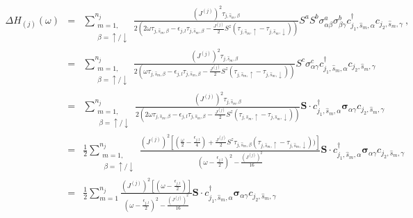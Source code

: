 \documentclass[aps,prl,preprint,groupedaddress]{revtex4-2}
\begin{document}
\begin{eqnarray}
\Delta H_{(j)}(\omega)&=&\sum_{\substack{m=1,\\ \beta=\uparrow/\downarrow}}^{n_{j}}\frac{(J^{(j)})^{2}\tau_{j,\hat{s}_{m},\beta}}{2(2\omega\tau_{j,\hat{s}_{m},\beta} - \epsilon_{j,l}\tau_{j,\hat{s}_{m},\beta}-\frac{J^{(j)}}{2}S^{z}(\tau_{j,\hat{s}_{m},\uparrow}-\tau_{j,\hat{s}_{m},\downarrow}))}S^{a}S^{b}\sigma^{a}_{\alpha\beta}\sigma^{b}_{\beta\gamma} c^{\dagger}_{j_{1},\hat{s}_{m},\alpha}c_{j_{2},\hat{s}_{m},\gamma}~,~~~~~~\nonumber\\
&=&\sum_{\substack{m=1,\\ \beta=\uparrow/\downarrow}}^{n_{j}}\frac{(J^{(j)})^{2}\tau_{j,\hat{s}_{m},\beta}}{2(\omega\tau_{j,\hat{s}_{m},\beta} - \epsilon_{j,l}\tau_{j,\hat{s}_{m},\beta}-\frac{J^{(j)}}{2}S^{z}(\tau_{j,\hat{s}_{m},\uparrow}-\tau_{j,\hat{s}_{m},\downarrow}))}S^{c}\sigma^{c}_{\alpha\gamma} c^{\dagger}_{j_{1},\hat{s}_{m},\alpha}c_{j_{2},\hat{s}_{m},\gamma}\nonumber\\
&=&\sum_{\substack{m=1,\\~\beta=\uparrow/\downarrow}}^{n_{j}}\frac{(J^{(j)})^{2}\tau_{j,\hat{s}_{m},\beta}}{2(2\omega\tau_{j,\hat{s}_{m},\beta}- \epsilon_{j,l}\tau_{j,\hat{s}_{m},\beta}-\frac{J^{(j)}}{2}S^{z}(\tau_{j,\hat{s}_{m},\uparrow}-\tau_{j,\hat{s}_{m},\downarrow}))}\mathbf{S}\cdot c^{\dagger}_{j_{1},\hat{s}_{m},\alpha}\boldsymbol{\sigma}_{\alpha\gamma} c_{j_{2},\hat{s}_{m},\gamma}\nonumber\\
&=&\frac{1}{2}\sum_{\substack{m=1,\\~\beta=\uparrow/\downarrow}}^{n_{j}}\frac{(J^{(j)})^{2}\left[(\frac{\omega}{2} - \frac{\epsilon_{j,l}}{4})+\frac{J^{(j)}}{2}S^{z}\tau_{j,\hat{s}_{m},\beta}(\tau_{j,\hat{s}_{m},\uparrow}-\tau_{j,\hat{s}_{m},\downarrow}))\right]}{(\omega - \frac{\epsilon_{j,l}}{2})^{2}-\frac{\left(J^{(j)}\right)^{2}}{16}}\mathbf{S}\cdot c^{\dagger}_{j_{1},\hat{s}_{m},\alpha}\boldsymbol{\sigma}_{\alpha\gamma}c_{j_{2},\hat{s}_{m},\gamma}\nonumber\\
&=&\frac{1}{2}\sum_{m=1}^{n_{j}}\frac{(J^{(j)})^{2}\left[(\omega - \frac{\epsilon_{j,l}}{2})\right]}{(\omega - \frac{\epsilon_{j,l}}{2})^{2}-\frac{\left(J^{(j)}\right)^{2}}{16}}\mathbf{S}\cdot c^{\dagger}_{j_{1},\hat{s}_{m},\alpha}\boldsymbol{\sigma}_{\alpha\gamma}c_{j_{2},\hat{s}_{m},\gamma}\nonumber\\\label{renH}
\end{eqnarray}
\end{document}
